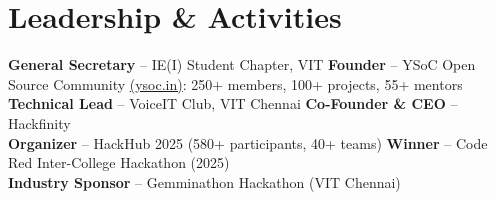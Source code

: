 \documentclass[a4paper,9.5pt]{article}
\begin{document}
\section*{Leadership \& Activities}
{\small
\noindent\textbf{General Secretary} -- IE(I) Student Chapter, VIT \hfill
\textbf{Founder} -- YSoC Open Source Community \href{https://ysoc.in}{(ysoc.in)}: 250+ members, 100+ projects, 55+ mentors\\[1pt]
\noindent\textbf{Technical Lead} -- VoiceIT Club, VIT Chennai \hfill
\textbf{Co-Founder \& CEO} -- Hackfinity\\[1pt]
\noindent\textbf{Organizer} -- HackHub 2025 (580+ participants, 40+ teams) \hfill
\textbf{Winner} -- Code Red Inter-College Hackathon (2025)\\[1pt]
\noindent\textbf{Industry Sponsor} -- Gemminathon Hackathon (VIT Chennai)
}
\end{document}
